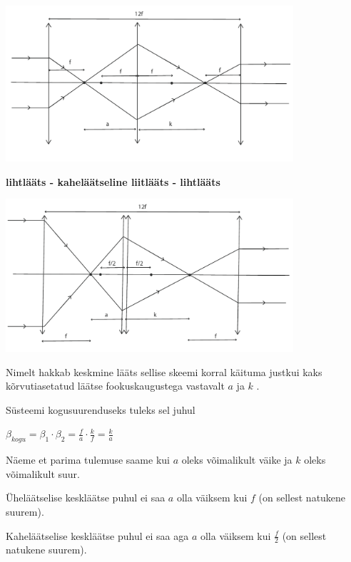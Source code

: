 \documentclass[12pt,a5paper]{article}
\begin{document}
\vspace{-10pt}
  \begin{center}
    \includegraphics[width=0.8\textwidth]{laatsed_lah4}
  \end{center}
  \vspace{-10pt}

\textbf{lihtlääts - kaheläätseline liitlääts - lihtlääts}

\vspace{-10pt}
  \begin{center}
    \includegraphics[width=0.8\textwidth]{laatsed_lah3}
  \end{center}
  \vspace{-10pt}

Nimelt hakkab keskmine lääts sellise skeemi korral käituma justkui kaks kõrvutiasetatud läätse fookuskaugustega vastavalt $ a $ ja $ k $ .

Süsteemi kogusuurenduseks tuleks sel juhul

 $ {\beta}_{kogu} = {\beta}_1 \cdot {\beta}_2 = \frac {f} {a} \cdot \frac {k} {f} = \frac {k}{a}$

Näeme et parima tulemuse saame kui $a$ oleks võimalikult väike ja $k$ oleks võimalikult suur.

Üheläätselise keskläätse puhul ei saa  $a$ olla väiksem kui $f$ (on sellest natukene suurem).

Kaheläätselise keskläätse puhul ei saa aga $a$ olla väiksem kui $ \frac {f}{2}$ (on sellest natukene suurem).
\end{document}
